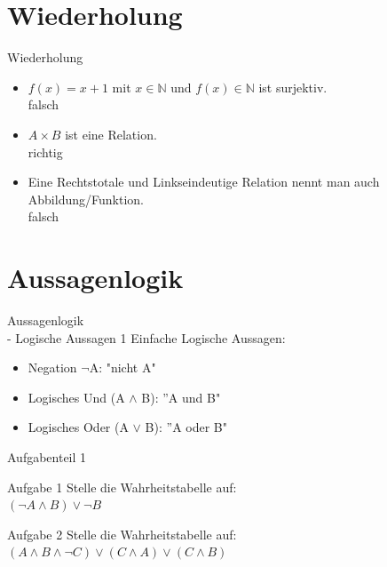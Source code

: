 \documentclass[18pt]{beamer}
\begin{document}
	\section{Wiederholung} 
	\begin{frame} {Wiederholung}
		\begin{itemize}
		\item $f(x) = x + 1$ mit $x \in \mathbb{N}$ und $f(x) \in \mathbb{N}$ ist surjektiv.\\
		\visible<2-4> {\color{red} falsch\\}
			\vspace{10pt}
		\color{black}
		\item $A \times B$ ist eine Relation.\\
		\visible<3-4> {\color{darkgreen} richtig\\}
			\vspace{10pt}
		\color{black}\item 
		Eine Rechtstotale und Linkseindeutige Relation nennt man auch Abbildung/Funktion.\\
		\visible<4> {\color{red} falsch\\}
		
		\end{itemize}
	\end{frame}
	
	\section{Aussagenlogik}
	\begin{frame}{Aussagenlogik\\ - Logische Aussagen 1}
	Einfache Logische Aussagen:
		\begin{itemize}
			\item Negation $\neg$A: "nicht A"
			\pause
			\item Logisches Und (A $\land$ B): ''A und B"
			\pause
			\item Logisches Oder (A $\lor$ B): ''A oder B"
		\end{itemize}
	\end{frame}


	\begin{frame}{Aufgabenteil 1}
		\begin{block}{Aufgabe 1}
			Stelle die Wahrheitstabelle auf:\\
			$(\neg A \land B) \lor \neg B$
		\end{block}
		
		\begin{block}{Aufgabe 2}
			Stelle die Wahrheitstabelle auf:\\
			$(A \land B \land \neg C) \lor (C \land A) \lor (C \land B)$
		\end{block}
	\end{frame}
\end{document}
